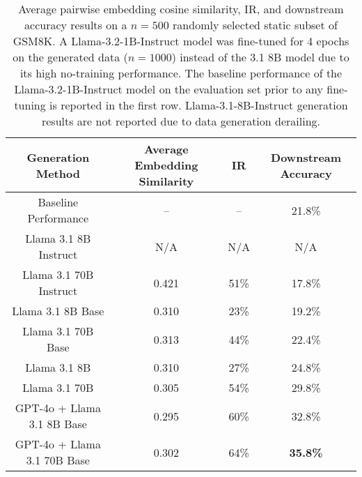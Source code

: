\begin{table}[H]
\caption{Average pairwise embedding cosine similarity, IR, and downstream accuracy results on a $n=500$ randomly selected static subset of GSM8K. A Llama-3.2-1B-Instruct model was fine-tuned for 4 epochs on the generated data ($n=1000$) instead of the 3.1 8B model due to its high no-training performance. The baseline performance of the Llama-3.2-1B-Instruct model on the evaluation set prior to any fine-tuning is reported in the first row. Llama-3.1-8B-Instruct generation results are not reported due to data generation derailing.}
\label{gsm8k-core}
\vskip 0.1in
\begin{center}
\begin{small}
\begin{sc} 
\begin{tabular}{c|ccc}
\toprule
Generation Method & Average Embedding Similarity & IR & Downstream Accuracy \\
\midrule
Baseline Performance               &   --  &  --  & 21.8\% \\
\midrule
Llama 3.1 8B Instruct              & N/A & N/A & N/A \\
Llama 3.1 70B Instruct             & 0.421 & 51\% & 17.8\% \\
Llama 3.1 8B Base                  & 0.310 & 23\% & 19.2\% \\
Llama 3.1 70B Base                 & 0.313 & 44\% & 22.4\% \\
\Sys{} Llama 3.1 8B                & 0.310 & 27\% & 24.8\% \\
\Sys{} Llama 3.1 70B               & 0.305 & 54\% & 29.8\% \\
\Sys{} GPT-4o + Llama 3.1 8B Base  & 0.295 & 60\% & 32.8\% \\
\Sys{} GPT-4o + Llama 3.1 70B Base & 0.302 & 64\% & \textbf{35.8\%} \\
\bottomrule
\end{tabular}
\end{sc}
\end{small}
\end{center}
\vskip -0.1in
\end{table}

